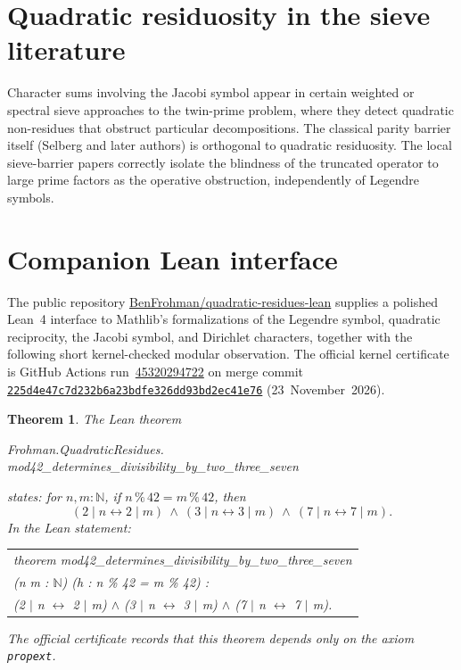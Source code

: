\documentclass[11pt,a4paper]{article}
\newtheorem{theorem}{Theorem}
\begin{document}
\section{Quadratic residuosity in the sieve literature}

Character sums involving the Jacobi symbol appear in certain weighted or spectral sieve approaches to the twin-prime problem, where they detect quadratic non-residues that obstruct particular decompositions. The classical parity barrier itself (Selberg and later authors) is orthogonal to quadratic residuosity. The local sieve-barrier papers correctly isolate the blindness of the truncated operator to large prime factors as the operative obstruction, independently of Legendre symbols.

\section{Companion Lean interface}

The public repository \href{https://github.com/BenFrohman/quadratic-residues-lean}{BenFrohman/quadratic-residues-lean} supplies a polished Lean~4 interface to Mathlib’s formalizations of the Legendre symbol, quadratic reciprocity, the Jacobi symbol, and Dirichlet characters, together with the following short kernel-checked modular observation. The official kernel certificate is GitHub Actions run~\href{https://github.com/BenFrohman/quadratic-residues-lean/actions/runs/45320294722}{45320294722} on merge commit \href{https://github.com/BenFrohman/quadratic-residues-lean/commit/225d4e47c7d232b6a23bdfe326dd93bd2ec41e76}{\texttt{225d4e47c7d232b6a23bdfe326dd93bd2ec41e76}} (23~November~2026).

\begin{theorem}
\label{thm:mod42}
The Lean theorem
\begin{center}
{\footnotesize\ttfamily Frohman.QuadraticResidues.\\
mod42\_determines\_divisibility\_by\_two\_three\_seven}
\end{center}
states: for \(n,m:\mathbb{N}\), if \(n \mathbin{\%} 42 = m \mathbin{\%} 42\), then
\[
(2 \mid n \leftrightarrow 2 \mid m)\ \land\ (3 \mid n \leftrightarrow 3 \mid m)\ \land\ (7 \mid n \leftrightarrow 7 \mid m).
\]
In the Lean statement:
\begin{center}
\ttfamily\footnotesize
\begin{tabular}{@{}l@{}}
theorem mod42\_determines\_divisibility\_by\_two\_three\_seven\\
\quad (n m : \(\mathbb{N}\)) (h : n \% 42 = m \% 42) :\\
\quad (2 \(\mid\) n \(\leftrightarrow\) 2 \(\mid\) m) \(\land\) (3 \(\mid\) n \(\leftrightarrow\) 3 \(\mid\) m) \(\land\) (7 \(\mid\) n \(\leftrightarrow\) 7 \(\mid\) m).
\end{tabular}
\end{center}
The official certificate records that this theorem depends only on the axiom \texttt{propext}.
\end{theorem}
\end{document}
